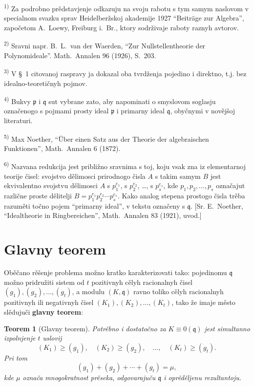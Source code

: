 \documentclass[11pt]{article}
\newcommand{\foreign}[1]{#1}
\theoremstyle{plain}
\newtheorem{satz}{Teorem}
\begin{document}
{\footnotesize
\textsuperscript{1)} Za podrobno prědstavjenje odkazuju na svoju rabotu s tym samym
naslovom v specialnom svazku sprav Heidelberžskoj akademije 1927
``\foreign{Beiträge zur Algebra}'', započetom \foreign{A.\ Loewy}, Freiburg i.\ Br., ktory
sodrživaje raboty raznyh avtorov.

\textsuperscript{2)} Sravni napr. \foreign{B.\ L.\ van der Waerden}, ``\foreign{Zur Nullstellentheorie der Polynomideale}''.
\foreign{Math.\ Annalen} 96 (1926), S.~203.

\textsuperscript{3)} V \S~1 citovanoj raspravy ja dokazal oba tvrdženja pojedino i direktno,
t.j. bez idealno-teoretičnyh pojmov.

\textsuperscript{4)} Bukvy $\mathfrak{p}$ i $\mathfrak{q}$ sut vybrane zato, aby napominati
o smyslovom soglasju označenogo s pojmami prosty ideal
$\mathfrak{p}$ i primarny ideal $\mathfrak{q}$, obyčnymi v novějšoj literaturi.

\textsuperscript{5)} \foreign{Max Noether}, ``\foreign{Über einen Satz aus der Theorie der algebraischen Funktionen}'',
\foreign{Math.\ Annalen} 6 (1872).

\textsuperscript{6)} Nazvana redukcija jest približno sravnima s toj, koju vsak zna iz
elementarnoj teorije čisel: svojstvo dělimosci prirodnogo čisla
$A$ s takim samym $B$ jest ekvivalentno svojstvu dělimosci $A$ s
$p_{1}^{e_{1}}$, s $p_{2}^{e_{2}}$, \ldots, s $p_{s}^{e_{s}}$, kde
$p_{1}, p_{2}, \ldots, p_{s}$ označajut različne proste dělitelji
$B = p_{1}^{e_{1}}p_{2}^{e_{2}} \cdots p_{s}^{e_{s}}$. Kako analog
stepena prostogo čisla trěba razuměti točno pojem ``primarny ideal'',
v tekstu označeny s $\mathfrak{q}$. [Sr. E.\ Noether,
``\foreign{Idealtheorie in Ringbereichen}'', \foreign{Math.\ Annalen} 83 (1921), uvod.]
}

\newpage
\section*{Glavny teorem}

Oběčano rěšenje problema možno kratko karakterizovati tako:
pojedinomu $\mathfrak{q}$ možno pridružiti sistem od $t$ pozitivnyh
cělyh racionalnyh čisel $(g_{1}), (g_{2}), \ldots, (g_{t})$, a
modulu $(K, \mathfrak{q})$ ravno toliko cělyh racionalnyh pozitivnyh
ili negativnyh čisel $(K_{1}), (K_{2}), \ldots, (K_{t})$, tako že
imaje město slědujuči \textbf{glavny teorem}:

\begin{satz}[Glavny teorem]\label{satz:kap-II}
Potrěbno i dostatočno za $K \equiv 0(\mathfrak{q})$ jest
simultanno izpolnjenje $t$ uslovij
\[
(K_{1}) \geq (g_{1}), \quad (K_{2}) \geq (g_{2}), \quad\ldots,\quad (K_{t}) \geq (g_{t}).
\]
Pri tom
\[
(g_{1}) + (g_{2}) + \cdots + (g_{t}) = \mu,
\]
kde $\mu$ označa mnogokratnost prěseka, odgovarajuču
$\mathfrak{q}$ i oprěděljenu rezultantoju.
\end{satz}
\end{document}
